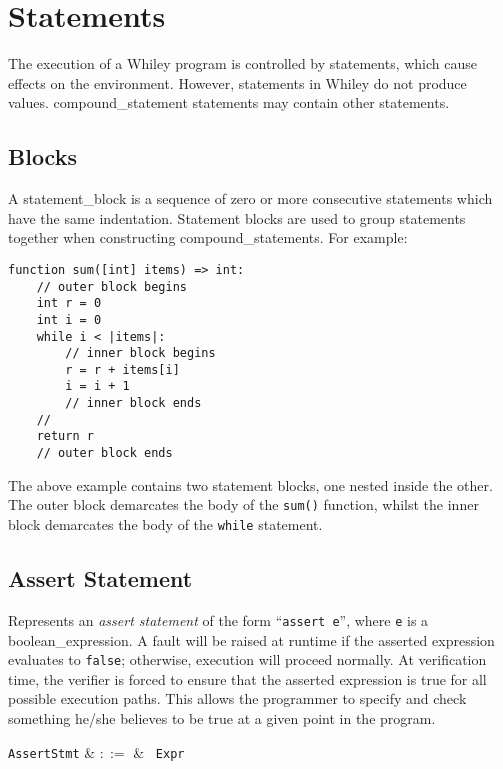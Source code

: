 \chapter{Statements}

The execution of a Whiley program is controlled by \gls{statement}s, which cause effects on the environment.  However, statements in Whiley do not produce values.  \Gls{compound_statement} statements may contain other statements.

\section{Blocks}
\label{c_stmts_blocks}

A \gls{statement_block} is a sequence of zero or more consecutive statements which have the same indentation.  Statement blocks are used to group statements together when constructing \gls{compound_statement}s.  For example:
\begin{lstlisting}
function sum([int] items) => int:
    // outer block begins
    int r = 0
    int i = 0
    while i < |items|:
        // inner block begins
        r = r + items[i]
        i = i + 1
        // inner block ends
    //
    return r
    // outer block ends
\end{lstlisting}
The above example contains two statement blocks, one nested inside the other.  The outer block demarcates the body of the \lstinline{sum()} function, whilst the inner block demarcates the body of the \lstinline{while} statement.


\section{Assert Statement}

Represents an {\em assert statement} of the form ``\lstinline{assert e}'', where \lstinline{e} is a \gls{boolean_expression}.  A \gls{fault} will be raised at runtime if the asserted expression evaluates to \lstinline{false}; otherwise, execution will proceed normally.  At verification time, the verifier is forced to ensure that the asserted expression is true for all possible execution paths.  This allows the programmer to specify and check something he/she believes to be true at a given point in the program.

\begin{syntax}
  \verb+AssertStmt+ & $::=$ & \ \verb+Expr+\\
\end{syntax}

